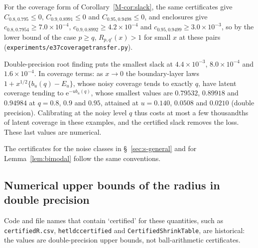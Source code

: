 \documentclass[11pt]{article}
\renewcommand{\_}{\usc\allowbreak}
\begin{document}
For the coverage form of Corollary~\ref{M-cor:slack}, the same certificates give $C_{0.8,0.795} \le 0$, $C_{0.9,0.8991} \le 0$ and $C_{0.95,0.9498} \le 0$, and enclosures give $c_{0.8,0.7954} \ge 7.0\times10^{-4}$, $c_{0.9,0.8992} \ge 4.2\times10^{-4}$ and $c_{0.95,0.9499} \ge 3.0\times10^{-3}$, so by the lower bound of the case $p \ge q$, $R_{p,q'}(x) > 1$ for small $x$ at these pairs (\texttt{experiments/e37\_coverage\_transfer.py}).

Double-precision root finding puts the smallest slack at $4.4\times10^{-3}$, $8.0\times10^{-4}$ and $1.6\times10^{-4}$. In coverage terms: as $x \to 0$ the boundary-layer laws $1 + x^{1/2}\{b_u(q) - E_u\}$, whose noisy coverage tends to exactly $q$, have latent coverage tending to $\mathrm{e}^{-ub_u(q)}$, whose smallest values are $0.79532$, $0.89918$ and $0.94984$ at $q = 0.8$, $0.9$ and $0.95$, attained at $u = 0.140$, $0.0508$ and $0.0210$ (double precision). Calibrating at the noisy level $q$ thus costs at most a few thousandths of latent coverage in these examples, and the certified slack removes the loss. These last values are numerical.

The certificates for the noise classes in \S~\ref{sec:s-general} and for Lemma~\ref{lem:bimodal} follow the same conventions.

\subsection*{Numerical upper bounds of the radius in double precision}

Code and file names that contain `certified' for these quantities, such as \texttt{certified\_R.csv}, \texttt{hetldc\_certified} and \texttt{CertifiedShrinkTable}, are historical: the values are double-precision upper bounds, not ball-arithmetic certificates.
\end{document}
